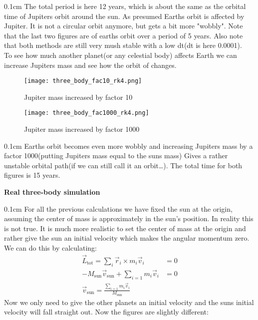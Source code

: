 \documentclass[11 pt, a4 paper]{article}
\newenvironment{tabbed}{\begin{addmargin}{0.1cm}}{\end{addmargin}}
\newcommand{\sectiontitle}[1]{\begin{center} \Large\textbf{{#1}} \end{center}}
\newcommand{\vsp}{\vspace{0.2cm}}
\begin{document}
    \begin{tabbed}
        The total period is here 12 years, which is about the same as the orbital time of Jupiters orbit around the sun. As presumed Earths orbit is affected by Jupiter. It is not a circular orbit anymore, but gets a bit more "wobbly". Note that the last two figures are of earths orbit over a period of 5 years. Also note that both methods are still very mush stable with a low dt(dt is here 0.0001).\vsp\\
        To see how much another planet(or any celestial body) affects Earth we can increase Jupiters mass and see how the orbit of changes.
    \end{tabbed}
        \captionsetup[figure]{labelformat=empty}
        \begin{figure}[H]
            \centering
            \texttt{[image: three\_body\_fac10\_rk4.png]}
            \caption{Jupiter mass increased by factor 10}
        \end{figure}
        \begin{figure}[H]
            \centering
            \texttt{[image: three\_body\_fac1000\_rk4.png]}
            \caption{Jupiter mass increased by factor 1000}
        \end{figure}
    \begin{tabbed}
        Earths orbit becomes even more wobbly and increasing Jupiters mass by a factor 1000(putting Jupiters mass equal to the suns mass) Gives a rather unstable orbital path(if we can still call it an orbit\dots). The total time for both figures is 15 years.
    \end{tabbed}
\sectiontitle{Real three-body simulation}
    \begin{tabbed}
        For all the previous calculations we have fixed the sun at the origin, assuming the center of mass is approximately in the sun's position. In reality this is not true. It is much more realistic to set the center of mass at the origin and rather give the sun an initial velocity which makes the angular momentum zero. We can do this by calculating:
        \begin{align*}
            \vec{L}_{\mbox{tot}} = \sum_i\vec{r}_i\times m_i\vec{v}_i &= 0\\
            -M_{\mbox{sun}}\vec{v}_{\mbox{sun}} + \sum_{i=1}m_i\vec{v}_i &= 0\\
            \vec{v}_{\mbox{sun}} = \frac{\sum_{i=1}m_i\vec{v}_i}{M_{\mbox{sun}}}& 
        \end{align*}
        Now we only need to give the other planets an initial velocity and the suns initial velocity will fall straight out. Now the figures are slightly different:
    \end{tabbed}
\end{document}
